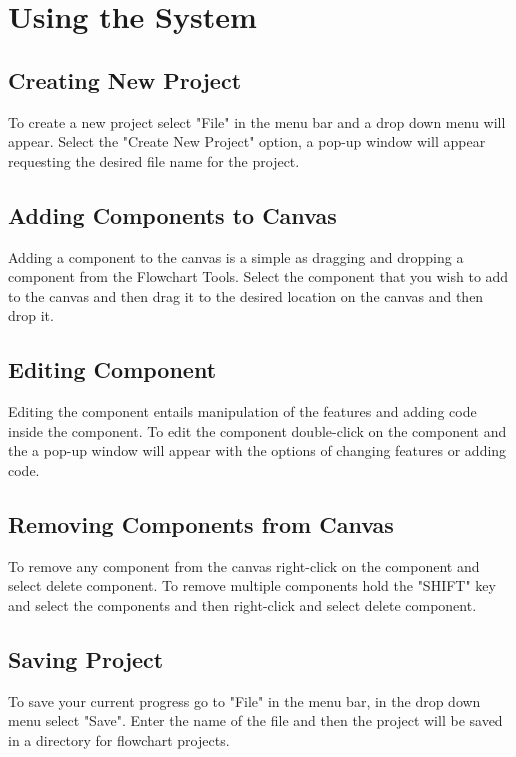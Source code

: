 \documentclass[11pt,a4paper,titlepage]{article}
\begin{document}
\section{Using the System}
	\subsection{Creating New Project}
	
		To create a new project select "File" in the menu bar and a drop down menu will appear. Select the "Create New Project" option, a pop-up window will appear requesting the desired file name for the project.
		
		
	\subsection{Adding Components to Canvas}
	
	Adding a component to the canvas is a simple as dragging and dropping a component from the Flowchart Tools. Select the component that you wish to add to the canvas and then drag it to the desired location on the canvas and then drop it.
	
	\subsection{Editing Component}
	
	Editing the component entails manipulation of the features and adding code inside the component. To edit the component double-click on the component and the a pop-up window will appear with the options of changing features or adding code.
		
	\subsection{Removing Components from Canvas}
	
	To remove any component from the canvas right-click on the component and select delete component. To remove multiple components hold the "SHIFT" key and select the components and then right-click and select delete component.
		
	\subsection{Saving Project}
	
	To save your current progress go to "File" in the menu bar, in the drop down menu select "Save". Enter the name of the file and then the project will be saved in a directory for flowchart projects.
	
\end{document}
